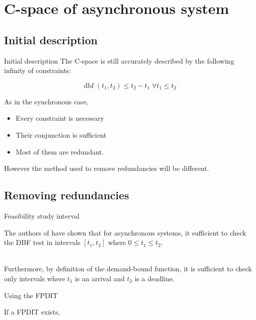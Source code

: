 \documentclass{beamer}
\newcommand{\dbf}[1]{\operatorname{dbf}(#1)}
\begin{document}
\section{C-space of asynchronous system}

    \begin{frame}
    \end{frame}

    \subsection{Initial description}

	\begin{frame}{Initial description}
		The C-space is still accurately described by the following infinity of constraints:

        $$\dbf{t_1, t_2} \leq t_2 - t_1 \; \forall t_1 \leqslant  t_2$$

        As in the synchronous case,
        \begin{itemize}
            \item Every constraint is necessary
            \item Their conjunction is sufficient
            \item Most of them are redundant.
        \end{itemize}
        However the method used to remove redundancies will be different.
	\end{frame}

    \subsection{Removing redundancies}

    \begin{frame}{Feasibility study interval}

        The authors of \cite{leung1982complexity} have shown that for asynchronous systems, it sufficient to check the DBF test in intervals $[t_1, t_2]$ where $0 \leqslant t_1 \leqslant t_2$.

        ~\\

        Furthermore, by definition of the demand-bound function, it is sufficient to check only intervals where $t_1$ is an arrival and $t_2$ is a deadline.

    \end{frame}

    \begin{frame}{Using the FPDIT}

        If a FPDIT exists,

    \end{frame}
\end{document}
